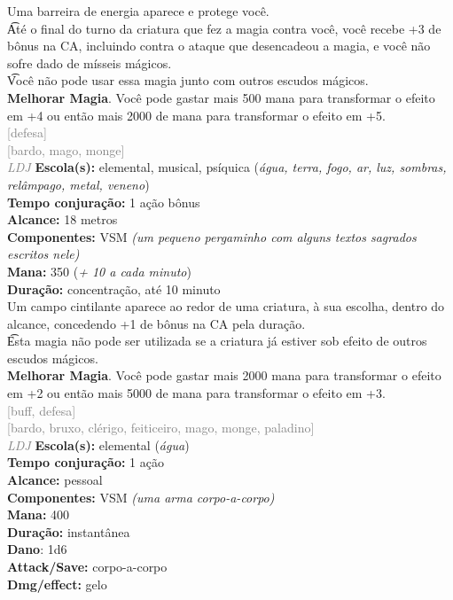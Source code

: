 \documentclass{RPG_Adventure}[2021/10/20]
\begin{document}
{\normalsize Uma barreira de energia aparece e protege você.\\\t Até o final do turno da criatura que fez a magia contra você, você recebe +3 de bônus na CA, incluindo contra o ataque que desencadeou a magia, e você não sofre dado de mísseis mágicos.\\\t Você não pode usar essa magia junto com outros escudos mágicos.\\\t \textbf{Melhorar Magia}. Você pode gastar mais 500 mana para transformar o efeito em +4 ou então mais 2000 de mana para transformar o efeito em +5.\\}
{\scriptsize \textcolor{gray}{[defesa]\\}}
{\scriptsize \textcolor{gray}{[bardo, mago, monge]\\}}
{\tiny \textcolor{gray}{\textit{LDJ}}}
{\small \t \textbf{Escola(s):} elemental, musical, psíquica (\textit{água, terra, fogo, ar, luz, sombras, relâmpago, metal, veneno})\\\t \textbf{Tempo conjuração:} 1 ação bônus\\\t \textbf{Alcance:} 18 metros\\\t \textbf{Componentes:} VSM \textit{(um pequeno pergaminho com alguns textos sagrados escritos nele)}\\\t \textbf{Mana:} 350 (\textit{+ 10 a cada minuto})\\\t \textbf{Duração:} concentração, até 10 minuto\\}
{\normalsize Um campo cintilante aparece ao redor de uma criatura, à sua escolha, dentro do alcance, concedendo +1 de bônus na CA pela duração.\\\t Esta magia não pode ser utilizada se a criatura já estiver sob efeito de outros escudos mágicos.\\\t \textbf{Melhorar Magia}. Você pode gastar mais 2000 mana para transformar o efeito em +2 ou então mais 5000 de mana para transformar o efeito em +3.\\}
{\scriptsize \textcolor{gray}{[buff, defesa]\\}}
{\scriptsize \textcolor{gray}{[bardo, bruxo, clérigo, feiticeiro, mago, monge, paladino]\\}}
{\tiny \textcolor{gray}{\textit{LDJ}}}
{\small \t \textbf{Escola(s):} elemental (\textit{água})\\\t \textbf{Tempo conjuração:} 1 ação\\\t \textbf{Alcance:} pessoal\\\t \textbf{Componentes:} VSM \textit{(uma arma corpo-a-corpo)}\\\t \textbf{Mana:} 400\\\t \textbf{Duração:} instantânea\\\t \textbf{Dano}: 1d6\\\t \textbf{Attack/Save:} corpo-a-corpo\\\t \textbf{Dmg/effect:} gelo\\}
\end{document}
